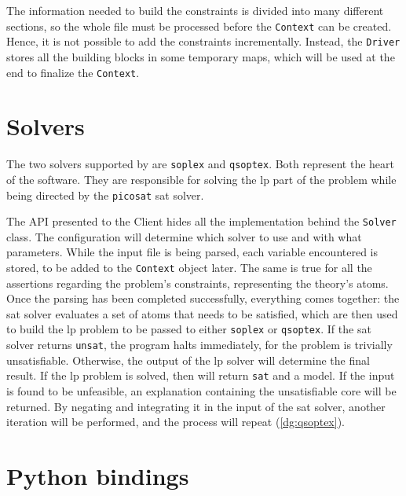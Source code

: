 The information needed to build the constraints is divided into many different sections, so the whole file must be processed before the \texttt{Context} can be created.
Hence, it is not possible to add the constraints incrementally.
Instead, the \texttt{Driver} stores all the building blocks in some temporary maps, which will be used at the end to finalize the \texttt{Context}.

\section{Solvers}

The two solvers supported by \dlinear are \texttt{soplex} and \texttt{qsoptex}.
Both represent the heart of the software.
They are responsible for solving the \gls{lp} part of the problem while being directed by the \texttt{picosat} \gls{sat} solver.

The API presented to the Client hides all the implementation behind the \texttt{Solver} class.
The configuration will determine which solver to use and with what parameters.
While the input file is being parsed, each variable encountered is stored, to be added to the \texttt{Context} object later.
The same is true for all the assertions regarding the problem's constraints, representing the theory's atoms.
Once the parsing has been completed successfully, everything comes together: the \gls{sat} solver evaluates a set of atoms that needs to be satisfied, which are then used to build the \gls{lp} problem to be passed to either \texttt{soplex} or \texttt{qsoptex}.
If the \gls{sat} solver returns \texttt{unsat}, the program halts immediately, for the problem is trivially unsatisfiable.
Otherwise, the output of the \gls{lp} solver will determine the final result.
If the \gls{lp} problem is solved, then \dlinear will return \texttt{sat} and a model.
If the input is found to be unfeasible, an explanation containing the unsatisfiable core will be returned.
By negating and integrating it in the input of the \gls{sat} solver, another iteration will be performed, and the process will repeat (\autoref{dg:qsoptex}).


\clearpage

\section{Python bindings}

